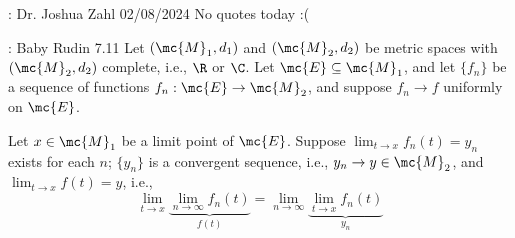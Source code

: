 \begin{nquote}{: Dr. Joshua Zahl 02/08/2024}
	No quotes today :(
\end{nquote}

\begin{ntheorem}{: Baby Rudin 7.11}
	Let \((\mc{M}_1,d_1)\) and \((\mc{M}_2,d_2)\) be metric spaces with \((\mc{M}_2,d_2)\) complete, i.e., \(\R\) or \(\C\). Let \(\mc{E}\subseteq \mc{M}_1\), and let \(\{f_n\}\) be a sequence of functions \(f_n:\mc{E}\to\mc{M}_2\), and suppose \(f_n\to f\) uniformly on \(\mc{E}\). 
	
	\medskip
	
	Let \(x\in\mc{M}_1\) be a limit point of \(\mc{E}\). Suppose \(\displaystyle\lim_{t\to x}f_n(t)=y_n\) exists for each \(n\); \(\{y_n\}\) is a convergent sequence, i.e., \(y_n\to y\in\mc{M}_2\), and \(\displaystyle\lim_{t\to x}f(t)=y\), i.e., 
	\begin{equation*}
		\lim_{t\to x}\underbrace{\lim_{n\to\infty}f_n(t)}_{f(t)}=\lim_{n\to\infty}\underbrace{\lim_{t\to x}f_n(t)}_{y_n}
	\end{equation*}
\end{ntheorem}

